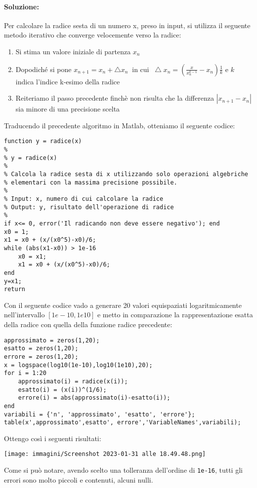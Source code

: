 \documentclass[12pt]{article}
\begin{document}
\paragraph{Soluzione:}
Per calcolare la radice sesta di un numero x, preso in input, si utilizza il seguente metodo iterativo che converge velocemente verso la radice:
\begin{enumerate}
    \item Si stima un valore iniziale di partenza \(x_n\)
    \item Dopodiché si pone \(x_{n+1}=x_n + \bigtriangleup x_n\;\; \text{in cui}\;\; \bigtriangleup x_n = (\frac{x}{x^{k-1}_n}-x_n)\frac{1}{k}\) e \(k\) indica l'indice k-esimo della radice
    \item Reiteriamo il passo precedente finchè non risulta che la differenza \(|x_{n+1}-x_n|\)  sia minore di una precisione scelta
\end{enumerate}
Traducendo il precedente algoritmo in Matlab, otteniamo il seguente codice:
\begin{lstlisting}[frame=single]
function y = radice(x)
% 
% y = radice(x)
% 
% Calcola la radice sesta di x utilizzando solo operazioni algebriche
% elementari con la massima precisione possibile.
% 
% Input: x, numero di cui calcolare la radice
% Output: y, risultato dell'operazione di radice
%
if x<= 0, error('Il radicando non deve essere negativo'); end
x0 = 1;
x1 = x0 + (x/(x0^5)-x0)/6;
while (abs(x1-x0)) > 1e-16
    x0 = x1;
    x1 = x0 + (x/(x0^5)-x0)/6;
end
y=x1;
return
\end{lstlisting}
Con il seguente codice vado a generare 20 valori equispaziati logaritmicamente nell'intervallo \([1e-10,1e10]\) e metto in comparazione la rappresentazione esatta della radice con
quella della funzione radice precedente:
\begin{lstlisting}[frame=single]
approssimato = zeros(1,20);
esatto = zeros(1,20);
errore = zeros(1,20);
x = logspace(log10(1e-10),log10(1e10),20);
for i = 1:20
    approssimato(i) = radice(x(i));
    esatto(i) = (x(i))^(1/6);
    errore(i) = abs(approssimato(i)-esatto(i));
end
variabili = {'n', 'approssimato', 'esatto', 'errore'};
table(x',approssimato',esatto', errore','VariableNames',variabili);  
\end{lstlisting}
Ottengo così i seguenti risultati:
\begin{center}
    \texttt{[image: immagini/Screenshot 2023-01-31 alle 18.49.48.png]}
\end{center}
Come si può notare, avendo scelto una tolleranza dell'ordine di \texttt{1e-16}, tutti gli errori sono molto piccoli e contenuti, alcuni nulli.
\pagebreak
\end{document}

